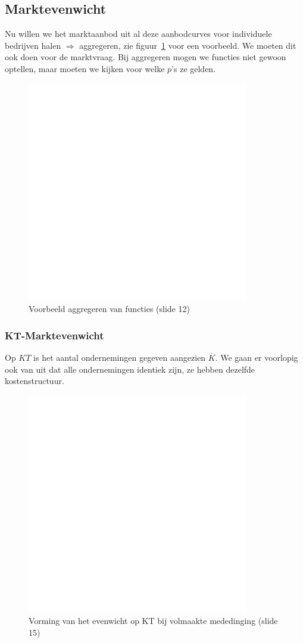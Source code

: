 \subsection{Marktevenwicht}
Nu willen we het marktaanbod uit al deze aanbodcurves voor individuele bedrijven halen $\Rightarrow$ aggregeren, zie figuur~\ref{fig:vbAggregeren} voor een voorbeeld. We moeten dit ook doen voor de marktvraag. Bij aggregeren mogen we functies niet gewoon optellen, maar moeten we kijken voor welke $p$'s ze gelden.
\begin{figure}[htbp]
   \centering
   \includegraphics[scale=0.4]{Images/white.png}
   \caption{Voorbeeld aggregeren van functies (slide 12)}
   \label{fig:vbAggregeren}
\end{figure}

\subsubsection{KT-Marktevenwicht}
Op $KT$ is het aantal ondernemingen gegeven aangezien $\overline{K}$. We gaan er voorlopig ook van uit dat alle ondernemingen identiek zijn, ze hebben dezelfde kostenstructuur.
\begin{figure}[htbp]
   \centering
   \includegraphics[scale=0.4]{Images/white.png}
   \caption{Vorming van het evenwicht op KT bij volmaakte mededinging (slide 15)}
   \label{fig:evenwichtkTVM}
\end{figure}

